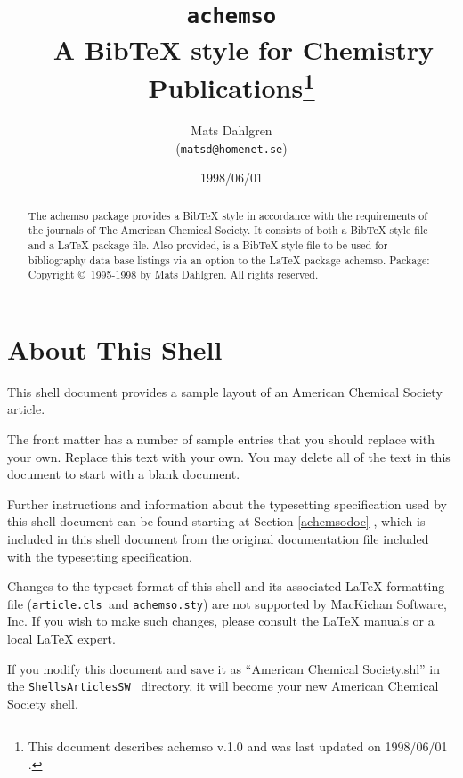 \documentclass{article}
\begin{document}
\title{\texttt{achemso}\\
-- A BibTeX style for Chemistry Publications\thanks{%
This document describes \textsf{achemso} v.1.0{} and was last updated on
1998/06/01 .}}
\author{Mats Dahlgren \\
(\texttt{matsd@homenet.se})}
\date{1998/06/01}
\maketitle

\begin{abstract}
The \textsf{achemso} package provides a BibTeX style in accordance with the
requirements of the journals of The American Chemical Society. It consists
of both a BibTeX style file and a LaTeX package file. Also provided, is a
BibTeX style file to be used for bibliography data base listings via an
option to the LaTeX package \textsf{achemso}. \newline
Package: Copyright \copyright\ 1995-1998 by Mats Dahlgren. All rights
reserved.
\end{abstract}

\section{About This Shell}

This shell document provides a sample layout of an American Chemical Society
article.

The front matter has a number of sample entries that you should replace with
your own. Replace this text with your own. You may delete all of the text in
this document to start with a blank document.

Further instructions and information about the typesetting specification
used by this shell document can be found starting at Section \ref{achemsodoc}%
, which is included in this shell document from the original documentation
file included with the typesetting specification.

Changes to the typeset format of this shell and its associated \LaTeX{}
formatting file (\texttt{article.cls }and \texttt{achemso.sty}) are not
supported by MacKichan Software, Inc. If you wish to make such changes,
please consult the \LaTeX{} manuals or a local \LaTeX{} expert.

If you modify this document and save it as ``American Chemical Society.shl''
in the \texttt{Shells\TEXTsymbol{\backslash}Articles\TEXTsymbol{\backslash}SW%
} directory, it will become your new American Chemical Society shell.
\end{document}
